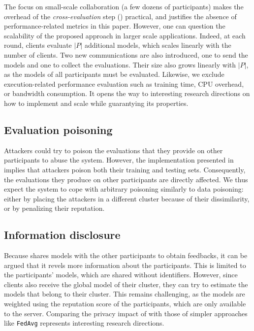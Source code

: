 The focus on small-scale collaboration (\ie a few dozens of participants) makes the overhead of the \emph{cross-evaluation} step () practical, and justifies the absence of performance-related metrics in this paper.
However, one can question the scalability of the proposed approach in larger scale applications.
Indeed, at each round, clients evaluate $|P|$ additional models, which scales linearly with the number of clients.
Two new communications are also introduced, one to send the models and one to collect the evaluations.
Their size also grows linearly with $|P|$, as the models of all participants must be evaluated.
Likewise, we exclude execution-related performance evaluation such as training time, CPU overhead, or bandwidth consumption.
It opens the way to interesting research directions on how to implement and scale \thecontrib while guarantying its properties.


\subsection{Evaluation poisoning}

Attackers could try to poison the evaluations that they provide on other participants to abuse the system.
However, the implementation presented in  implies that attackers poison both their training and testing sets.
Consequently, the evaluations they produce on other participants are directly affected.
We thus expect the system to cope with arbitrary poisoning similarly to data poisoning: either by placing the attackers in a different cluster because of their dissimilarity, or by penalizing their reputation. 


\subsection{Information disclosure}

Because \thecontrib shares models with the other participants to obtain feedbacks, it can be argued that it revels more information about the participants.
This is limited to the participants' models, which are shared without identifiers.
However, since clients also receive the global model of their cluster, they can try to estimate the models that belong to their cluster.
This remains challenging, as the models are weighted using the reputation score of the participants, which are only available to the server.
Comparing the privacy impact of \thecontrib with those of simpler approaches like \texttt{FedAvg} represents interesting research directions.

